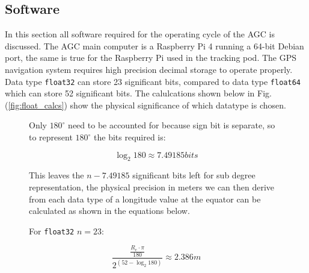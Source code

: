\documentclass[11pt,landscape]{article}
\begin{document}
\begin{multicols}{3}
\section{Software}
\label{software}
In this section all software required for the operating cycle of the AGC is
discussed. The AGC main computer is a Raspberry Pi 4 running a 64-bit Debian port,
the same is true for the Raspberry Pi used in the tracking pod. The GPS
navigation system requires high precision decimal storage to operate properly.
Data type \verb|float32| can store 23 significant bits, compared to data type
\verb|float64| which can store 52 significant
bits\cite{floating_point_goldberg}. 
The calulcations shown below in Fig. (\ref{fig:float_calcs}) show the
physical significance of which datatype is chosen.
\begin{figure}[H]
    \begin{mdframed}
        Only $180^{\circ}$ need to be accounted for because sign bit is separate, so to
        represent $180^{\circ}$ the bits required is:
        \begin{center}
            \begin{equation*}
                \log_2{180} \approx 7.49185 bits
            \end{equation*}
        \end{center}
        This leaves the $n - 7.49185$ significant bits left for sub degree
        representation, the physical precision in meters we can then derive from each
        data type of a longitude value at the equator can be calculated as shown in
        the equations below.\newline
        \begin{center}
            \begin{minipage}{0.45\textwidth}
                \begin{mdframed}
                    For \verb|float32| $n=23$:
                    \begin{center}
                        \begin{equation*}
                            \frac{\frac{R_e \cdot \pi}{180}}{2^{\left(52 - \log_2{180}\right)}} \approx 2.386m
                            \label{eq}
                        \end{equation*}
                    \end{center}
                \end{mdframed}
                \end{minipage}
                \begin{minipage}{0.45\textwidth}

\end{minipage}
\end{center}
\end{mdframed}
\end{figure}
\end{multicols}
\end{document}
